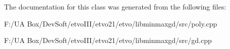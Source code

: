 The documentation for this class was generated from the following files\+:\begin{DoxyCompactItemize}
\item 
F\+:/\+U\+A Box/\+Dev\+Soft/etvo\+I\+I\+I/etvo21/etvo/libminmaxgd/src/poly.\+cpp\item 
F\+:/\+U\+A Box/\+Dev\+Soft/etvo\+I\+I\+I/etvo21/etvo/libminmaxgd/src/gd.\+cpp\end{DoxyCompactItemize}
